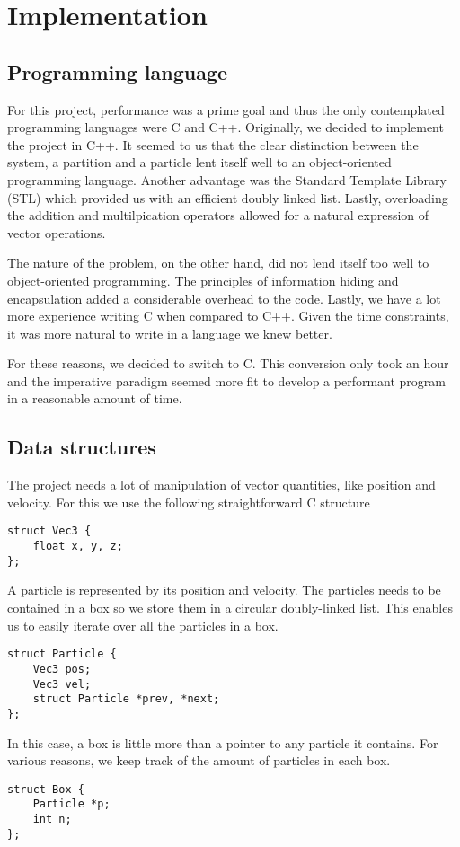 \section{Implementation}

\subsection{Programming language}
For this project, performance was a prime goal and thus the only contemplated 
programming languages were C and C++.  Originally, we decided to implement the 
project in C++. It seemed to us that the clear distinction between the system, 
a partition and a particle lent itself well to an object-oriented programming 
language. Another advantage was the Standard Template Library (STL) which 
provided us with an efficient doubly linked list. Lastly, overloading the 
addition and multilpication operators allowed for a natural expression of 
vector operations.

The nature of the problem, on the other hand, did not lend itself too well to 
object-oriented programming. The principles of information hiding and 
encapsulation added a considerable overhead to the code. Lastly, we have a lot 
more experience writing C when compared to C++. Given the time constraints, it 
was more natural to write in a language we knew better.

For these reasons, we decided to switch to C.  This conversion only took an 
hour and the imperative paradigm seemed more fit to develop a performant 
program in a reasonable amount of time.

\subsection{Data structures}

The project needs a lot of manipulation of vector quantities, like position 
and velocity. For this we use the following straightforward C structure

\begin{lstlisting}
struct Vec3 {
	float x, y, z;
};
\end{lstlisting}

A particle is represented by its position and velocity. The particles needs to 
be contained in a box so we store them in a circular doubly-linked list. This 
enables us to easily iterate over all the particles in a box.
\begin{lstlisting}
struct Particle {
	Vec3 pos;
	Vec3 vel;
	struct Particle *prev, *next;
};
\end{lstlisting}
In this case, a box is little more than a pointer to any particle it contains.  
For various reasons, we keep track of the amount of particles in each box.
\begin{lstlisting}
struct Box {
	Particle *p;
	int n;
};
\end{lstlisting}

